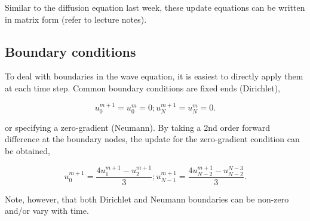 \documentclass[12pt]{article}
\begin{document}
\vspace{4mm}

Similar to the diffusion equation last week, these update equations can be written in matrix form (refer to lecture notes).

\subsection{Boundary conditions}

To deal with boundaries in the wave equation, it is easiest to directly apply them at each time step. Common boundary conditions are fixed ends (Dirichlet),

\vspace{2mm}

$$u_0^{m+1} = u_0^m = 0 ; u_N^{m+1} = u_N^m = 0.$$

\vspace{4mm}

or specifying a zero-gradient (Neumann). By taking a 2nd order forward difference at the boundary nodes, the update for the zero-gradient condition can be obtained, 

\vspace{2mm}

$$u_0^{m+1} = \frac{4u_1^{m+1} - u_2^{m+1}}{3} ; u_{N-1}^{m+1} = \frac{4u_{N-2}^{m+1} - u_{N-2}^{N-3}}{3}. $$

\vspace{4mm}

Note, however, that both Dirichlet and Neumann boundaries can be non-zero and/or vary with time.
\end{document}
